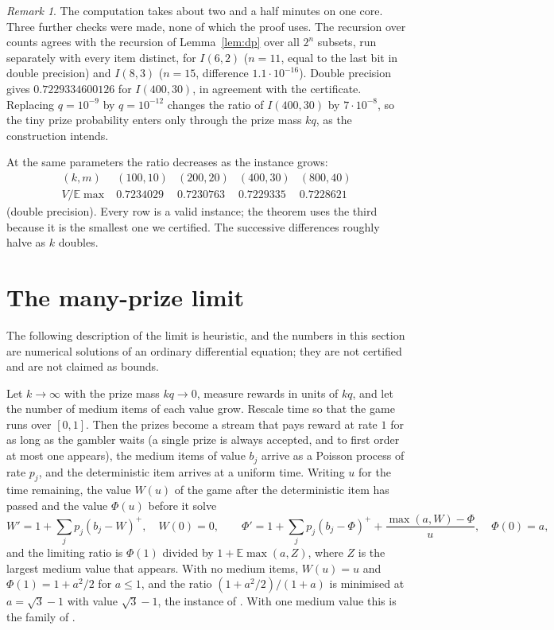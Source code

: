 \documentclass[11pt]{amsart}
\theoremstyle{remark}\newtheorem{remark}[theorem]{Remark}
\newcommand{\E}{\mathbb{E}}
\begin{document}
\begin{remark}
The computation takes about two and a half minutes on one core. Three further checks were made, none of which the proof
uses. The recursion over counts agrees with the recursion of Lemma~\ref{lem:dp} over all $2^n$ subsets, run separately
with every item distinct, for $I(6,2)$ ($n=11$, equal to the last bit in double precision) and $I(8,3)$ ($n=15$,
difference $1.1\cdot10^{-16}$). Double precision gives $0.7229334600126$ for $I(400,30)$, in agreement with the
certificate. Replacing $q=10^{-9}$ by $q=10^{-12}$ changes the ratio of $I(400,30)$ by $7\cdot10^{-8}$, so the tiny prize
probability enters only through the prize mass $kq$, as the construction intends.
\end{remark}

At the same parameters the ratio decreases as the instance grows:
\[
\begin{array}{c|cccc}
(k,m) & (100,10) & (200,20) & (400,30) & (800,40)\\\hline
V/\E\max & 0.7234029 & 0.7230763 & 0.7229335 & 0.7228621
\end{array}
\]
(double precision). Every row is a valid instance; the theorem uses the third because it is the smallest one we
certified. The successive differences roughly halve as $k$ doubles.

\section{The many-prize limit}\label{sec:limit}

The following description of the limit is heuristic, and the numbers in this section are numerical solutions of an
ordinary differential equation; they are not certified and are not claimed as bounds.

Let $k\to\infty$ with the prize mass $kq\to0$, measure rewards in units of $kq$, and let the number of medium items of
each value grow. Rescale time so that the game runs over $[0,1]$. Then the prizes become a stream that pays reward at
rate $1$ for as long as the gambler waits (a single prize is always accepted, and to first order at most one appears),
the medium items of value $b_j$ arrive as a Poisson process of rate $p_j$, and the deterministic item arrives at a
uniform time. Writing $u$ for the time remaining, the value $W(u)$ of the game after the deterministic item has passed and
the value $\Phi(u)$ before it solve
\[
W'=1+\sum_jp_j(b_j-W)^+,\quad W(0)=0,\qquad
\Phi'=1+\sum_jp_j(b_j-\Phi)^++\frac{\max(a,W)-\Phi}{u},\quad \Phi(0)=a,
\]
and the limiting ratio is $\Phi(1)$ divided by $1+\E\max(a,Z)$, where $Z$ is the largest medium value that appears. With
no medium items, $W(u)=u$ and $\Phi(1)=1+a^2/2$ for $a\le1$, and the ratio $(1+a^2/2)/(1+a)$ is minimised at $a=\sqrt3-1$
with value $\sqrt3-1$, the instance of \cite{csz}. With one medium value this is the family of \cite{gms}.
\end{document}

